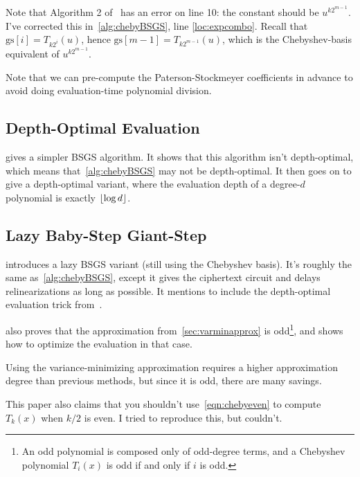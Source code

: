 \documentclass[../fheimpl.tex]{subfiles}
\begin{document}
	Note that Algorithm 2 of~\cite{cryptoeprint:2018/1043} has an error on line 10: the constant should be $u^{k2^{m-1}}$. I've corrected this in~\cref{alg:chebyBSGS}, line \ref{loc:expcombo}. Recall that $\mathrm{gs}[i] = T_{k2^i}(u)$, hence $\mathrm{gs}[m-1]=T_{k2^{m-1}}(u)$, which is the Chebyshev-basis equivalent of $u^{k2^{m-1}}$.
	
	Note that we can pre-compute the Paterson-Stockmeyer coefficients in advance to avoid doing evaluation-time polynomial division.
	
	\subsection{Depth-Optimal Evaluation}
	\cite{cryptoeprint:2020/1203} gives a simpler BSGS algorithm. It shows that this algorithm isn't depth-optimal, which means that~\cref{alg:chebyBSGS} may not be depth-optimal. It then goes on to give a depth-optimal variant, where the evaluation depth of a degree-$d$ polynomial is exactly $\lfloor\log d\rfloor$.
	
	
	\subsection{Lazy Baby-Step Giant-Step}
	\cite{cryptoeprint:2020/1549} introduces a lazy BSGS variant (still using the Chebyshev basis). It's roughly the same as~\cref{alg:chebyBSGS}, except it gives the ciphertext circuit and delays relinearizations as long as possible. It mentions to include the depth-optimal evaluation trick from~\cite{cryptoeprint:2020/1203}.
	
	\cite{cryptoeprint:2020/1549} also proves that the approximation from~\cref{sec:varminapprox} is odd\footnote{An odd polynomial is composed only of odd-degree terms, and a Chebyshev polynomial $T_i(x)$ is odd if and only if $i$ is odd.}, and shows how to optimize the evaluation in that case.
	
	Using the variance-minimizing approximation requires a higher approximation degree than previous methods, but since it is odd, there are many savings. 
	
	This paper also claims that you shouldn't use~\cref{eqn:chebyeven} to compute $T_k(x)$ when $k/2$ is even. I tried to reproduce this, but couldn't.
	
\end{document}
